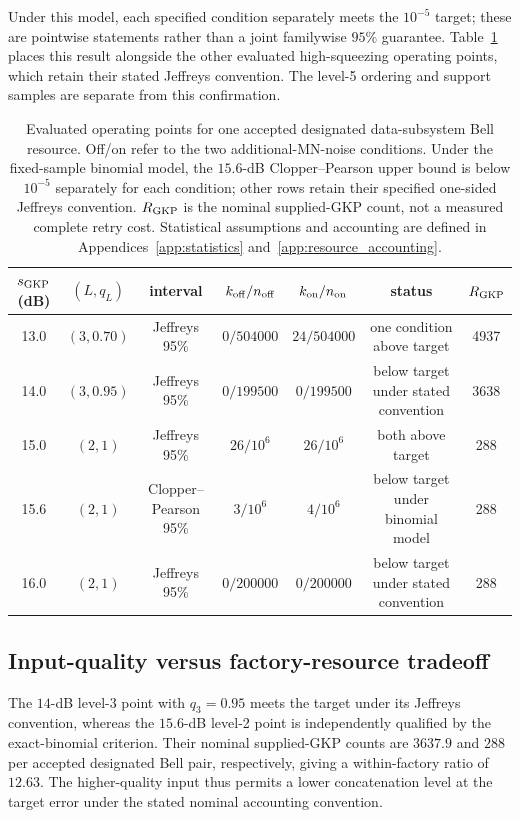 \documentclass[aps,
prx,
superscriptaddress,
reprint,
longbibliography,
floatfix]{revtex4-2}
\newcounter{criterion}[section]
\begin{document}
Under this model, each specified condition separately meets the $10^{-5}$ target; these are pointwise statements rather than a joint familywise $95\%$ guarantee. Table~\ref{tab:qualified_operating_points} places this result alongside the other evaluated high-squeezing operating points, which retain their stated Jeffreys convention. The level-5 ordering and support samples are separate from this confirmation.

\begin{table}[t]
\centering
\small
\setlength{\tabcolsep}{4.5pt}
\begin{tabular*}{\textwidth}{@{\extracolsep{\fill}}ccccccc}
\toprule
$s_{\rm GKP}$ (dB) & $(L,q_L)$ & interval & $k_{\rm off}/n_{\rm off}$ & $k_{\rm on}/n_{\rm on}$ & status & $R_{\rm GKP}$ \\
\midrule
13.0 & $(3,0.70)$ & Jeffreys 95\% & $0/504000$ & $24/504000$ & one condition above target & 4937 \\
14.0 & $(3,0.95)$ & Jeffreys 95\% & $0/199500$ & $0/199500$ & below target under stated convention & 3638 \\
15.0 & $(2,1)$ & Jeffreys 95\% & $26/10^6$ & $26/10^6$ & both above target & 288 \\
15.6 & $(2,1)$ & Clopper--Pearson 95\% & $3/10^6$ & $4/10^6$ & below target under binomial model & 288 \\
16.0 & $(2,1)$ & Jeffreys 95\% & $0/200000$ & $0/200000$ & below target under stated convention & 288 \\
\bottomrule
\end{tabular*}
\caption{Evaluated operating points for one accepted designated data-subsystem Bell resource. Off/on refer to the two additional-MN-noise conditions. Under the fixed-sample binomial model, the $15.6$-dB Clopper--Pearson upper bound is below $10^{-5}$ separately for each condition; other rows retain their specified one-sided Jeffreys convention. $R_{\rm GKP}$ is the nominal supplied-GKP count, not a measured complete retry cost. Statistical assumptions and accounting are defined in Appendices~\ref{app:statistics} and~\ref{app:resource_accounting}.}
\label{tab:qualified_operating_points}
\end{table}

\subsection{Input-quality versus factory-resource tradeoff}\label{sec:resource_accounting}\label{sec:rhg_scope}
The $14$-dB level-3 point with $q_3=0.95$ meets the target under its Jeffreys convention, whereas the $15.6$-dB level-2 point is independently qualified by the exact-binomial criterion. Their nominal supplied-GKP counts are $3637.9$ and $288$ per accepted designated Bell pair, respectively, giving a within-factory ratio of $12.63$. The higher-quality input thus permits a lower concatenation level at the target error under the stated nominal accounting convention.
\end{document}
